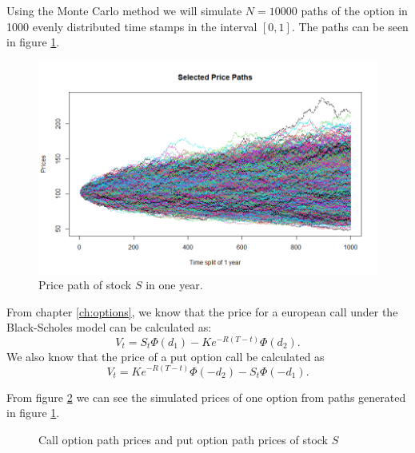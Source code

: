 \documentclass[a4paper, 12pt]{article}
\theoremstyle{definition}
\theoremstyle{plain}
\theoremstyle{definition}
\begin{document}
Using the Monte Carlo method we will simulate 
$N = 10000$ paths of the option in 1000 evenly 
distributed time stamps in the interval $[0,1]$.
The paths can be seen in 
figure \ref{fig:price_path}.

\begin{figure}[!ht]
    \centering
    \caption{Price path of stock $S$ in one year.}
    \label{fig:price_path}
    \includegraphics[scale=0.65]{price_paths.png}
 \end{figure}
 
From chapter \ref{ch:options}, we know 
that the price for a european call under the Black-Scholes model
can be calculated as:
$$
    V_t = S_t\Phi(d_1) - Ke^{-R(T-t)}\Phi(d_2).
$$
We also know that the price of a put option call be calculated as
$$
    V_t = Ke^{-R(T-t)}\Phi(-d_2)-S_t\Phi(-d_1).
$$    

From figure \ref{fig:option_prices} we can see 
the simulated prices
of one option from paths 
generated in figure \ref{fig:price_path}. 

\begin{figure}[ht!]
    \centering

    \caption{Call option path prices 
            and put option path prices of stock $S$}
 \label{fig:option_prices}
 \end{figure}
 
\end{document}
